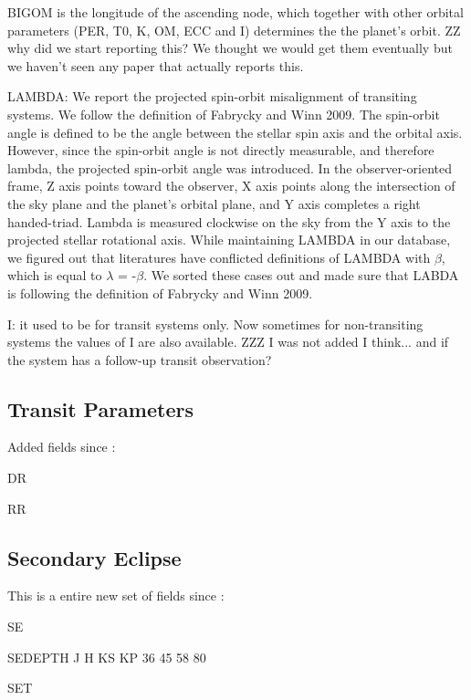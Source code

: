 \documentclass[11pt,preprint]{aastex}
\begin{document}
\begin{CJK*}{UTF8}{gbsn}
BIGOM is the longitude of the ascending node, which together with other orbital parameters (PER, T0, K, OM, ECC and I) determines the the planet's orbit. 
ZZ why did we start reporting this?
We thought we would get them eventually but we haven't seen any paper that actually reports this.

LAMBDA: We report the projected spin-orbit misalignment of transiting systems. We follow the definition of Fabrycky and Winn 2009. The spin-orbit angle is defined to be the angle between the stellar spin axis and the orbital axis. However, since the spin-orbit angle is not directly measurable, and therefore lambda, the projected spin-orbit angle was introduced. In the observer-oriented frame, Z axis points toward the observer, X axis points along the intersection of the sky plane and the planet's orbital plane, and Y axis completes a right handed-triad. Lambda is measured clockwise on the sky from the Y axis to the projected stellar rotational axis. While maintaining LAMBDA in our database, we figured out that literatures have conflicted definitions of LAMBDA with $\beta$, which is equal to $\lambda$ = -$\beta$. We sorted these cases out and made sure that LABDA is following the definition of Fabrycky and Winn 2009. 


I: it used to be for transit systems only. Now sometimes for
non-transiting systems the values of I are also available.
ZZZ I was not added I think... and if the system has a follow-up transit observation?


\subsection{Transit Parameters}

Added fields since \cite{Wright2011}:

DR

RR

\subsection{Secondary Eclipse}

This is a entire new set of fields since \cite{Wright2011}:

SE

SEDEPTH J H KS KP 36 45 58 80

SET


\end{CJK*}
\end{document}
